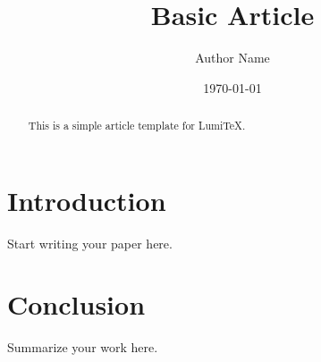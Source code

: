 \documentclass[11pt]{article}
\title{Basic Article}
\author{Author Name}
\date{\today}
\begin{document}
\maketitle

\begin{abstract}
This is a simple article template for LumiTeX.
\end{abstract}

\section{Introduction}
Start writing your paper here.

\section{Conclusion}
Summarize your work here.
\end{document}
